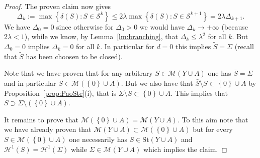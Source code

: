 \documentclass{amsart}
\renewcommand{\H}{\mathcal H}
\newcommand{\ENCLOSE}[1]{\left\{#1\right\}}
\newcommand{\St}{\mathrm{St}}
\newcommand{\M}{\mathcal{M}}
\renewcommand{\H}{\mathcal{H}}
\renewcommand{\S}{\mathcal{S}}
\theoremstyle{definition}
\theoremstyle{remark}
\begin{document}
\begin{proof}
The proven claim now gives 
\[
  \Delta_k 
  := \max\ENCLOSE{\delta(S)\colon S\in \S^k}
   \le 2\lambda \max\ENCLOSE{\delta(S)\colon S\in \S^{k+1}}
   = 2 \lambda \Delta_{k+1}.
\]
We have $\Delta_0 = 0$ since otherwise for 
$\Delta_0>0$ we would have 
$\Delta_k\to +\infty$ (because $2\lambda <1$), while we know,
by Lemma~\ref{lm:branching}, that $\Delta_k \le \lambda^2$
for all $k$.
But $\Delta_0 =0$ implies $\Delta_k=0$ for all $k$.
In particular for $d=0$ this implies $\tilde S=\Sigma$ 
(recall that $\tilde S$ has been choosen to be closed).

Note that we have proven that for any arbitrary $S\in \M(Y\cup A)$ 
one has $\bar S= \Sigma$ and in particular $S\in \M(\ENCLOSE 0 \cup A)$. 
But we also have that $\bar S \setminus S \subset \ENCLOSE{0}\cup A$
by Proposition~\ref{prop:PaoSte}(i),
that is $\Sigma\setminus S \subset \ENCLOSE 0 \cup A$.
This implies that $S\supset \Sigma\setminus(\ENCLOSE 0 \cup A)$.

It remains to prove that $\M(\ENCLOSE 0 \cup A) = \M(Y\cup A)$.
To this aim note that we have already proven 
that $\M(Y\cup A) \subset \M(\ENCLOSE 0 \cup A)$
but for every $S\in \M(\ENCLOSE 0 \cup A)$ one necessarily has 
$S\in \St(Y\cup A)$ and $\H^1(S)=\H^1(\Sigma)$ while
$\Sigma \in \M(Y\cup A)$ which implies the claim.

\end{proof}
\end{document}

